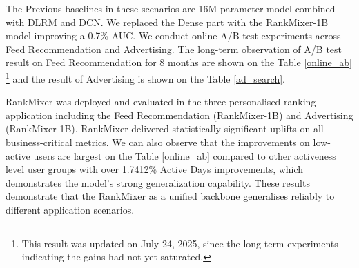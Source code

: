 
The Previous baselines in these scenarios are 16M parameter model combined with DLRM and DCN. We replaced the Dense part with the RankMixer-1B model improving a 0.7\% AUC. We conduct online A/B test experiments across Feed Recommendation and Advertising. The long-term observation of A/B test result on Feed Recommendation for 8 months  are shown on the Table \ref{online_ab} \footnote{This result was updated on July 24, 2025, since the long-term experiments indicating the gains had not yet saturated.}
\unskip and the result of Advertising is shown on the Table \ref{ad_search}.


RankMixer was deployed and evaluated in the three personalised-ranking application including the Feed Recommendation (RankMixer-1B) and Advertising (RankMixer-1B). RankMixer delivered statistically significant uplifts on all business-critical metrics. We can also observe that the improvements on low-active users are largest on the Table \ref{online_ab} compared to other activeness level user groups with over 1.7412\% Active Days improvements, which demonstrates the model’s strong generalization capability.
These results demonstrate that the RankMixer as a unified backbone generalises reliably to different application scenarios. 





